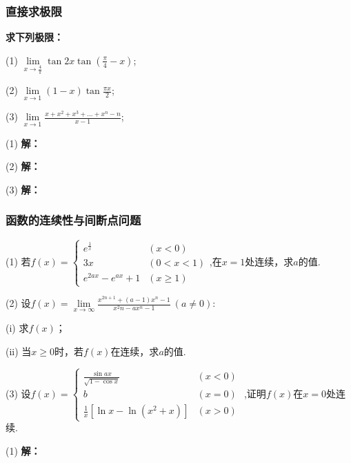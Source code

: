 \documentclass[12pt , a4paper , oneside]{ctexart}
\begin{document}
            \subsubsection{直接求极限}
            \textbf{求下列极限：}

            (1) $\lim\limits_{x \to \frac{4}{\pi}} \tan{2x} \tan{(\frac{\pi}{4}-x)}$;

            (2) $\lim\limits_{x \to 1} (1-x)\tan{\frac{\pi x}{2}}$;

            (3) $\lim\limits_{x \to 1} \frac{x+x^2+x^3+...+x^n - n}{x-1}$;

            \begin{mdframed}
            (1) \textbf{解：}
            \end{mdframed}

            \begin{mdframed}
            (2) \textbf{解：}
            \end{mdframed}

            \begin{mdframed}
            (3) \textbf{解：}
            \end{mdframed}

            \subsubsection{函数的连续性与间断点问题}
            (1) 若$f(x) = \begin{cases}
                e^{\frac{1}{x}} & (x < 0)\\
                3x & (0<x<1)\\
                e^{2ax} - e^{ax} + 1 & (x \geqslant 1)
            \end{cases}$,在$x=1$处连续，求$a$的值.

            (2) 设$f(x)=\lim\limits_{x \to \infty} \frac{x^{2n+1} + (a-1)x^n - 1}{x^2n -ax^n - 1}~(a\neq 0)$:
            
            \qquad (i) 求$f(x)$；

            \qquad (ii) 当$x \geqslant 0$时，若$f(x)$在连续，求$a$的值.

            (3) 设$f(x) = \begin{cases}
                \frac{\sin{ax}}{\sqrt{1-\cos{x}}} & (x < 0)\\
                b & (x = 0)\\
                \frac{1}{x} [ \ln{x}-\ln{(x^2 + x)} ] & (x > 0)\end{cases}$
                ,证明$f(x)$在$x=0$处连续.
            \begin{mdframed}
            (1) \textbf{解：}
            \end{mdframed}
\end{document}
